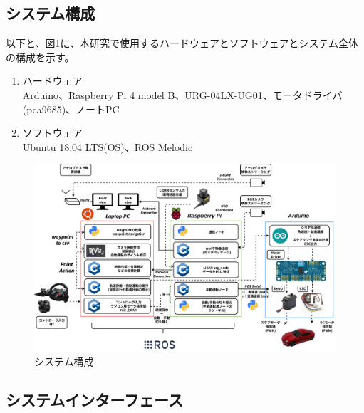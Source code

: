 \subsection{システム構成}
以下と、図\ref{auto:system}に、本研究で使用するハードウェアとソフトウェアとシステム全体の構成を示す。
\begin{enumerate}
  \item ハードウェア\\
  Arduino、Raspberry Pi 4 model B、URG-04LX-UG01、モータドライバ(pca9685)、ノートPC
  \item ソフトウェア\\
  Ubuntu 18.04 LTS(OS)、ROS Melodic
\end{enumerate}

\begin{figure}[h]
  \begin{center}
  \includegraphics[width=\linewidth]{img/auto_2.pdf}
  \caption{システム構成}
  \label{auto:system}
  \end{center}
\end{figure}

\subsection{システムインターフェース}
